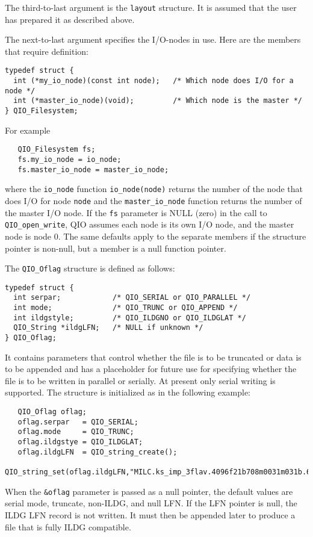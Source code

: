 \documentclass{article}
\begin{document}
The third-to-last argument is the \verb|layout| structure.  It is
assumed that the user has prepared it as described above.

The next-to-last argument specifies the I/O-nodes in use.  Here are
the members that require definition:
%
\begin{verbatim}
typedef struct {
  int (*my_io_node)(const int node);   /* Which node does I/O for a node */
  int (*master_io_node)(void);         /* Which node is the master */
} QIO_Filesystem;
\end{verbatim}
%
For example
%
\begin{verbatim}
   QIO_Filesystem fs;
   fs.my_io_node = io_node;
   fs.master_io_node = master_io_node;
\end{verbatim}
%
where the \verb|io_node| function \verb|io_node(node)| returns the
number of the node that does I/O for node \verb|node| and the
\verb|master_io_node| function returns the number of the master I/O
node.  If the \verb|fs| parameter is NULL (zero) in the call to
\verb|QIO_open_write|, QIO assumes each node is its own I/O node, and
the master node is node 0.  The same defaults apply to the separate
members if the structure pointer is non-null, but a member is a null
function pointer.

The \verb|QIO_Oflag| structure is defined as follows:
%
\begin{verbatim}
typedef struct {
  int serpar;            /* QIO_SERIAL or QIO_PARALLEL */
  int mode;              /* QIO_TRUNC or QIO_APPEND */
  int ildgstyle;         /* QIO_ILDGNO or QIO_ILDGLAT */
  QIO_String *ildgLFN;   /* NULL if unknown */
} QIO_Oflag;
\end{verbatim}
%

It contains parameters that control whether the file is to be
truncated or data is to be appended and has a placeholder for future
use for specifying whether the file is to be written in parallel or
serially.  At present only serial writing is supported.  The structure
is initialized as in the following example:

%
\begin{verbatim}
   QIO_Oflag oflag;
   oflag.serpar   = QIO_SERIAL;
   oflag.mode     = QIO_TRUNC;
   oflag.ildgstye = QIO_ILDGLAT;
   oflag.ildgLFN  = QIO_string_create();
   QIO_string_set(oflag.ildgLFN,"MILC.ks_imp_3flav.4096f21b708m0031m031b.696");
\end{verbatim}
%

When the \verb|&oflag| parameter is passed as a null pointer, the
default values are serial mode, truncate, non-ILDG, and null LFN.  If
the LFN pointer is null, the ILDG LFN record is not written.  It must
then be appended later to produce a file that is fully ILDG compatible.
\end{document}

